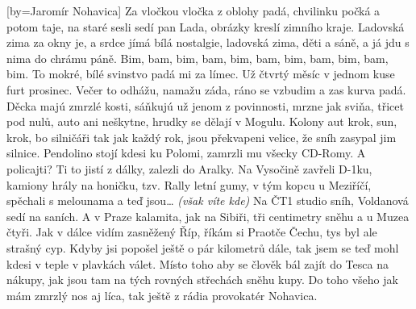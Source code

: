 [by={Jaromír Nohavica}]
\freev
\chordsoff
Za vločkou vločka z oblohy padá,
chvilinku počká a potom taje,
na staré sesli sedí pan Lada,
obrázky kreslí zimního kraje.
\cl
\chordsoff
\chor
Ladovská zima za okny je,
a srdce jímá bílá nostalgie,
ladovská zima, děti a sáně,
a já jdu s nima do chrámu páně.
Bim, bam, bim, bam, bim, bam,
bim, bam, bim, bam, bim.
\cl
\freev
To mokré, bílé svinstvo padá mi za límec.
Už čtvrtý měsíc v jednom kuse furt prosinec.
Večer to odhážu, namažu záda,
ráno se vzbudim a zas kurva padá.
Děcka majú zmrzlé kosti,
sáňkujú už jenom z povinnosti,
mrzne jak sviňa, třicet pod nulů,
auto ani neškytne, hrudky se dělají v Mogulu.
Kolony aut krok, sun, krok,
bo silničáři tak jak každý rok,
jsou překvapeni velice,
že sníh zasypal jim silnice.
Pendolino stojí kdesi ku Polomi,
zamrzli mu všecky CD-Romy.
A policajti? Ti to jistí z dálky,
zalezli do Aralky.
\cl
\repchorus{\emptyspace}
\freev
Na Vysočině zavřeli D-1ku,
kamiony hrály na honičku,
tzv. Rally letní gumy,
v tým kopcu u Meziříčí,
spěchali s melounama a teď jsou… \emph{(však víte kde)}
Na ČT1 studio sníh,
Voldanová sedí na saních.
A v Praze kalamita, jak na Sibiři,
tři centimetry sněhu a u Muzea čtyři.
Jak v dálce vidím zasněžený Říp,
říkám si Praotče Čechu, tys byl ale strašný cyp.
Kdyby jsi popošel ještě o pár kilometrů dále,
tak jsem se teď mohl kdesi v teple v plavkách válet.
Místo toho aby se člověk bál zajít do Tesca na nákupy,
jak jsou tam na tých rovných střechách sněhu kupy.
Do toho všeho jak mám zmrzlý nos aj líca,
tak ještě z rádia provokatér Nohavica.
\cl
\repchorus{\emptyspace}
\endsong


